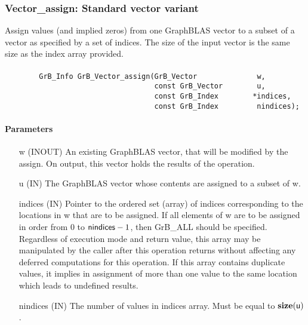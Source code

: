 \subsubsection{{\sf Vector\_assign}: Standard vector variant}

Assign values (and implied zeros) from one GraphBLAS vector to a subset of a 
vector as specified by a set of indices. The size of the input vector is the
same size as the index array provided.

\paragraph{\syntax}

\begin{verbatim}
        GrB_Info GrB_Vector_assign(GrB_Vector              w,
                                   const GrB_Vector        u,
                                   const GrB_Index        *indices,
                                   const GrB_Index         nindices);
\end{verbatim}

\paragraph{Parameters}

\begin{itemize}[leftmargin=1in]
    \item[{\sf w}] ({\sf INOUT}) An existing GraphBLAS vector, that will
    be modified by the assign.  On output, this vector holds the results
    of the operation.

    \item[{\sf u}] ({\sf IN}) The GraphBLAS vector whose contents are
    assigned to a subset of {\sf w}.

    \item[{\sf indices}] ({\sf IN}) Pointer to the ordered set (array)
    of indices corresponding to the locations in {\sf w} that are to be
    assigned.  If all elements of {\sf w} are to be assigned in order from
    $0$ to ${\sf nindices} - 1$, then {\sf GrB\_ALL} should be specified.
    Regardless of execution mode and return value, this array may be
    manipulated by the caller after this operation returns without
    affecting any deferred computations for this operation.  If this
    array contains duplicate values, it implies in assignment of more
    than one value to the same location which leads to undefined results.

    \item[{\sf nindices}] ({\sf IN}) The number of values in {\sf
    indices} array.  Must be equal to $\bold{size}({\sf u})$.
\end{itemize}

